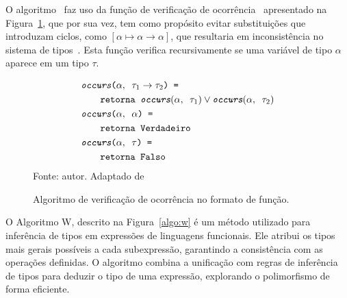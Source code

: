 O algoritmo \Unify\ faz uso da função de verificação de ocorrência \Occurs\ apresentado na Figura~\ref{algo:occurs}, que por sua vez, tem como propósito evitar substituições que introduzam ciclos, como $[\alpha\mapsto\alpha\to\alpha]$, que resultaria em inconsistência no sistema de tipos~\cite{ribeiro2016mechanized}.
Esta função verifica recursivamente se uma variável de tipo $\alpha$ aparece em um tipo $\tau$.

\begin{figure}[ht!]
  \caption{Algoritmo de verificação de ocorrência no formato de função.}
  \centering
  \begin{align*}
     & \texttt{\ensuremath{\textit{occurs}}($\alpha, \texttt{ } \tau_1 \to \tau_2$) = }                                                       \\
     & \qquad{}\texttt{\ensuremath{\text{retorna}}\ensuremath{\texttt{ }}$\textit{occurs}(\alpha, \texttt{ } \tau_1) \lor \textit{occurs}(\alpha, \texttt{ }\tau_2)$} \\
     & \texttt{\ensuremath{\textit{occurs}}($\alpha, \texttt{ } \alpha$) = }                                                                  \\
     & \qquad{}\texttt{\ensuremath{\text{retorna}}\ensuremath{\texttt{ }}\ensuremath{\texttt{Verdadeiro}}}                                                                         \\
     & \texttt{\ensuremath{\textit{occurs}}($\alpha, \texttt{ } \tau$) = }                                                                    \\
     & \qquad{}\texttt{\ensuremath{\text{retorna}}\ensuremath{\texttt{ }}\ensuremath{\texttt{Falso}}}
  \end{align*}
  \small{Fonte: autor. Adaptado de~\cite{ribeiro2016mechanized}}\label{algo:occurs}
\end{figure}

O Algoritmo W, descrito na Figura~\ref{algo:w} é um método utilizado para inferência de tipos em expressões de linguagens funcionais.
Ele atribui os tipos mais gerais possíveis a cada subexpressão, garantindo a consistência com as operações definidas.
O algoritmo combina a unificação com regras de inferência de tipos para deduzir o tipo de uma expressão, explorando o polimorfismo de forma eficiente.

